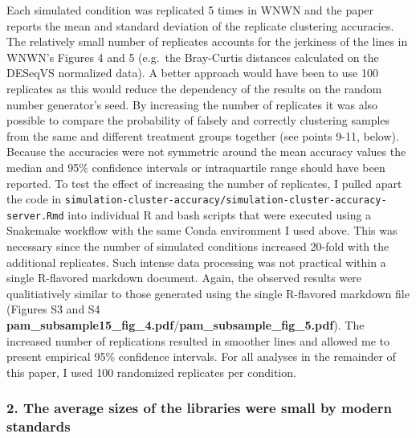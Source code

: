 \documentclass[
]{article}
\begin{document}
Each simulated condition was replicated 5 times in WNWN and the paper
reports the mean and standard deviation of the replicate clustering
accuracies. The relatively small number of replicates accounts for the
jerkiness of the lines in WNWN's Figures 4 and 5 (e.g.~the Bray-Curtis
distances calculated on the DESeqVS normalized data). A better approach
would have been to use 100 replicates as this would reduce the
dependency of the results on the random number generator's seed. By
increasing the number of replicates it was also possible to compare the
probability of falsely and correctly clustering samples from the same
and different treatment groups together (see points 9-11, below).
Because the accuracies were not symmetric around the mean accuracy
values the median and 95\% confidence intervals or intraquartile range
should have been reported. To test the effect of increasing the number
of replicates, I pulled apart the code in
\texttt{simulation-cluster-accuracy/simulation-cluster-accuracy-server.Rmd}
into individual R and bash scripts that were executed using a Snakemake
workflow with the same Conda environment I used above. This was
necessary since the number of simulated conditions increased 20-fold
with the additional replicates. Such intense data processing was not
practical within a single R-flavored markdown document. Again, the
observed results were qualitiatively similar to those generated using
the single R-flavored markdown file (Figures S3 and S4
\textbf{pam\_subsample15\_fig\_4.pdf}/\textbf{pam\_subsample\_fig\_5.pdf}).
The increased number of replications resulted in smoother lines and
allowed me to present empirical 95\% confidence intervals. For all
analyses in the remainder of this paper, I used 100 randomized
replicates per condition.

\hypertarget{the-average-sizes-of-the-libraries-were-small-by-modern-standards}{%
\subsubsection{2. The average sizes of the libraries were small by
modern
standards}\label{the-average-sizes-of-the-libraries-were-small-by-modern-standards}}
\end{document}

